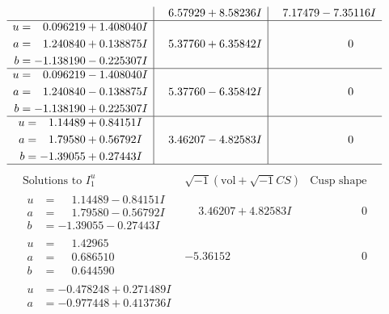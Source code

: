 \documentclass[1p]{elsarticle_modified}
\theoremstyle{definition}
\newcommand{\I}{\sqrt{-1}}
\begin{document}
$$\begin{array}{c|c|c}
 & \phantom{-}6.57929 + 8.58236 I & \phantom{-}7.17479 - 7.35116 I \\ \hline\begin{aligned}
u &= \phantom{-}0.096219 + 1.408040 I \\
a &= \phantom{-}1.240840 + 0.138875 I \\
b &= -1.138190 - 0.225307 I\end{aligned}
 & \phantom{-}5.37760 + 6.35842 I & \phantom{-0.000000 } 0 \\ \hline\begin{aligned}
u &= \phantom{-}0.096219 - 1.408040 I \\
a &= \phantom{-}1.240840 - 0.138875 I \\
b &= -1.138190 + 0.225307 I\end{aligned}
 & \phantom{-}5.37760 - 6.35842 I & \phantom{-0.000000 } 0 \\ \hline\begin{aligned}
u &= \phantom{-}1.14489 + 0.84151 I \\
a &= \phantom{-}1.79580 + 0.56792 I \\
b &= -1.39055 + 0.27443 I\end{aligned}
 & \phantom{-}3.46207 - 4.82583 I & \phantom{-0.000000 } 0\\
 \hline 
 \end{array}$$\newpage$$\begin{array}{c|c|c}  
\text{Solutions to }I^u_{1}& \I (\text{vol} + \sqrt{-1}CS) & \text{Cusp shape}\\
 \hline 
\begin{aligned}
u &= \phantom{-}1.14489 - 0.84151 I \\
a &= \phantom{-}1.79580 - 0.56792 I \\
b &= -1.39055 - 0.27443 I\end{aligned}
 & \phantom{-}3.46207 + 4.82583 I & \phantom{-0.000000 } 0 \\ \hline\begin{aligned}
u &= \phantom{-}1.42965\phantom{ +0.000000I} \\
a &= \phantom{-}0.686510\phantom{ +0.000000I} \\
b &= \phantom{-}0.644590\phantom{ +0.000000I}\end{aligned}
 & -5.36152\phantom{ +0.000000I} & \phantom{-0.000000 } 0 \\ \hline\begin{aligned}
u &= -0.478248 + 0.271489 I \\
a &= -0.977448 + 0.413736 I \\

\end{aligned}
\end{array}$$
\end{document}
